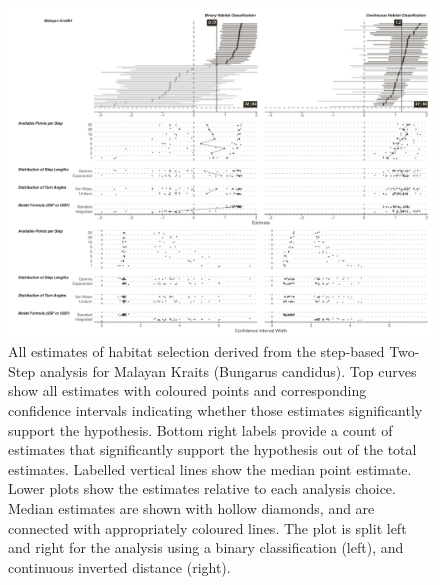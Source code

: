 \documentclass[10pt,a4paper]{article}
\begin{document}
\begin{figure}
\includegraphics[width=1\linewidth]{../../figures/specCurve_Malayan Krait_twoStep} \caption{All estimates of habitat selection derived from the step-based Two-Step analysis for Malayan Kraits (Bungarus candidus). Top curves show all estimates with coloured points and corresponding confidence intervals indicating whether those estimates significantly support the hypothesis. Bottom right labels provide a count of estimates that significantly support the hypothesis out of the total estimates. Labelled vertical lines show the median point estimate. Lower plots show the estimates relative to each analysis choice. Median estimates are shown with hollow diamonds, and are connected with appropriately coloured lines. The plot is split left and right for the analysis using a binary classification (left), and continuous inverted distance (right).}\label{fig:specCurveTwoStepBUCA}
\end{figure}
\end{document}
